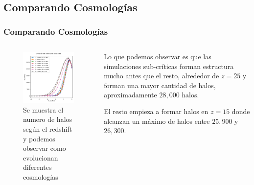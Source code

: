 \documentclass{beamer}
\begin{document}
\subsection{Comparando Cosmologías}
	\begin{frame}
		\frametitle{Comparando Cosmologías}
		\begin{columns}[t]
           	\begin{column}{.5\textwidth}

				\begin{figure}
					\centering
					\includegraphics[scale=0.31]{Conc/TotalHalos_Conc.png}
					\caption{\footnotesize Se muestra el numero de halos según el redshift y podemos observar como evolucionan diferentes cosmologías }
					\label{fig:TotalHalos_Conc}
				\end{figure}

	        \end{column}
    	    \begin{column}{.5\textwidth}

    	    	Lo que podemos observar es que las simulaciones sub-críticas forman estructura mucho antes que el resto, alrededor de $z=25$ y forman una mayor cantidad de halos, aproximadamente $28,000$ halos.
    	    	
    	    	El resto empieza a formar halos en $z=15$ donde alcanzan un máximo de halos entre $25,900$ y $26,300$.

        	\end{column}
	    \end{columns}

	\end{frame}
\end{document}
